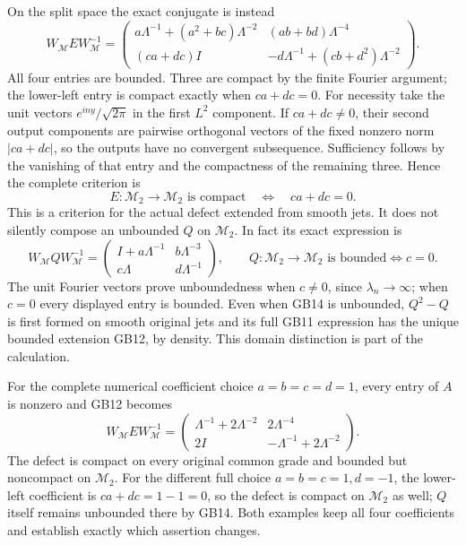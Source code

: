 \documentclass[
  11pt,
]{article}
\begin{document}
On the split space the exact conjugate is instead \[
 W_{\mathcal M}EW_{\mathcal M}^{-1}
 =\begin{pmatrix}
 a\Lambda^{-1}+(a^2+bc)\Lambda^{-2}&(ab+bd)\Lambda^{-4}\\
 (ca+dc)I&-d\Lambda^{-1}+(cb+d^2)\Lambda^{-2}
 \end{pmatrix}.
 \tag{GB12}
\] All four entries are bounded. Three are compact by the finite Fourier
argument; the lower-left entry is compact exactly when \(ca+dc=0\). For
necessity take the unit vectors \(e^{iny}/\sqrt{2\pi}\) in the first
\(L^2\) component. If \(ca+dc\ne0\), their second output components are
pairwise orthogonal vectors of the fixed nonzero norm \(|ca+dc|\), so
the outputs have no convergent subsequence. Sufficiency follows by the
vanishing of that entry and the compactness of the remaining three.
Hence the complete criterion is \[
 E:\mathcal M_2\longrightarrow\mathcal M_2\text{ is compact}
 \quad\Longleftrightarrow\quad ca+dc=0.
 \tag{GB13}
\] This is a criterion for the actual defect extended from smooth jets.
It does not silently compose an unbounded \(Q\) on \(\mathcal M_2\). In
fact its exact expression is \[
 W_{\mathcal M}QW_{\mathcal M}^{-1}
 =\begin{pmatrix}I+a\Lambda^{-1}&b\Lambda^{-3}\\
                  c\Lambda&d\Lambda^{-1}\end{pmatrix},\qquad
 Q:\mathcal M_2\to\mathcal M_2\text{ is bounded}
       \Longleftrightarrow c=0.
 \tag{GB14}
\] The unit Fourier vectors prove unboundedness when \(c\ne0\), since
\(\lambda_n\to\infty\); when \(c=0\) every displayed entry is bounded.
Even when GB14 is unbounded, \(Q^2-Q\) is first formed on smooth
original jets and its full GB11 expression has the unique bounded
extension GB12, by density. This domain distinction is part of the
calculation.

For the complete numerical coefficient choice \(a=b=c=d=1\), every entry
of \(A\) is nonzero and GB12 becomes \[
 W_{\mathcal M}EW_{\mathcal M}^{-1}
 =\begin{pmatrix}\Lambda^{-1}+2\Lambda^{-2}&2\Lambda^{-4}\\
                  2I&-\Lambda^{-1}+2\Lambda^{-2}\end{pmatrix}.
 \tag{GB15}
\] The defect is compact on every original common grade and bounded but
noncompact on \(\mathcal M_2\). For the different full choice
\(a=b=c=1,d=-1\), the lower-left coefficient is \(ca+dc=1-1=0\), so the
defect is compact on \(\mathcal M_2\) as well; \(Q\) itself remains
unbounded there by GB14. Both examples keep all four coefficients and
establish exactly which assertion changes.
\end{document}
